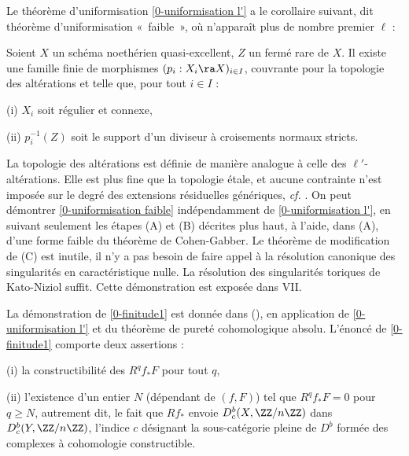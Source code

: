 \documentclass[10pt]{../fichiers-configuration-latex/smfart}
\begin{document}
Le théorème d'uniformisation \ref{0-uniformisation l'} a le corollaire suivant, dit théorème
d'uniformisation « faible », où n'apparaît plus de nombre premier $\ell$ :
\begin{corollaire}\label{0-uniformisation faible} Soient $X$ un schéma noethérien quasi-excellent,
$Z$ un fermé rare de $X$. Il existe une famille finie de morphismes $(p_i : X_i \ra X)_{i \in I}$,
couvrante pour la topologie des altérations et telle que, pour tout $i \in I$ :

(i) $X_i$ soit régulier et connexe,

(ii) $p_i^{-1}(Z)$ soit le support d'un diviseur à croisements normaux stricts.  \end{corollaire} La
topologie des altérations est définie de manière analogue à celle des $\ell'$-altérations. Elle est
plus fine que la topologie étale, et aucune contrainte n'est imposée sur le degré des extensions
résiduelles génériques, \textit{cf.} . On peut démontrer \ref{0-uniformisation
faible} indépendamment de \ref{0-uniformisation l'}, en suivant seulement les étapes (A) et (B)
décrites plus haut, à l'aide, dans (A), d'une forme faible du théorème de Cohen-Gabber. Le théorème
de modification de (C) est inutile, il n'y a pas besoin de faire appel à la résolution canonique des
singularités en caractéristique nulle. La résolution des singularités toriques de Kato-Niziol
suffit. Cette démonstration est exposée dans VII.

\medskip La démonstration de \ref{0-finitude1} est donnée dans (), en application de \ref{0-uniformisation l'} et du théorème de pureté
cohomologique absolu. L'énoncé de \ref{0-finitude1} comporte deux assertions :

(i) la constructibilité des $R^qf_*F$ pour tout $q$,

(ii) l'existence d'un entier $N$ (dépendant de $(f,F)$) tel que $R^qf_*F = 0$ pour $q \ge N$,
autrement dit, le fait que $Rf_*$ envoie $D^b_c(X,\ZZ/n\ZZ)$ dans $D^b_c(Y,\ZZ/n\ZZ)$, l'indice $c$
désignant la sous-catégorie pleine de $D^b$ formée des complexes à cohomologie constructible. 
\end{document}
